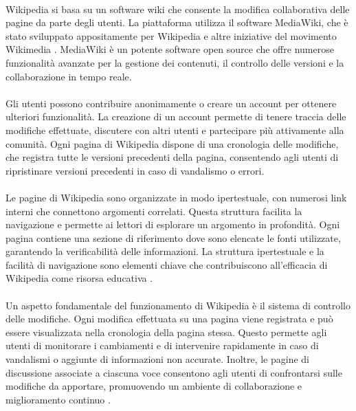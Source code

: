 \documentclass[12pt,a4paper]{report}
\begin{document}
\paragraph*{}
Wikipedia si basa su un software wiki che consente la modifica collaborativa delle pagine da parte degli utenti. La piattaforma utilizza il software MediaWiki, che è stato sviluppato appositamente per Wikipedia e altre iniziative del movimento Wikimedia \cite{denning2005wikipedia}. MediaWiki è un potente software open source che offre numerose funzionalità avanzate per la gestione dei contenuti, il controllo delle versioni e la collaborazione in tempo reale.
\paragraph*{}
Gli utenti possono contribuire anonimamente o creare un account per ottenere ulteriori funzionalità. La creazione di un account permette di tenere traccia delle modifiche effettuate, discutere con altri utenti e partecipare più attivamente alla comunità. Ogni pagina di Wikipedia dispone di una cronologia delle modifiche, che registra tutte le versioni precedenti della pagina, consentendo agli utenti di ripristinare versioni precedenti in caso di vandalismo o errori.
\paragraph*{}
Le pagine di Wikipedia sono organizzate in modo ipertestuale, con numerosi link interni che connettono argomenti correlati. Questa struttura facilita la navigazione e permette ai lettori di esplorare un argomento in profondità. Ogni pagina contiene una sezione di riferimento dove sono elencate le fonti utilizzate, garantendo la verificabilità delle informazioni. La struttura ipertestuale e la facilità di navigazione sono elementi chiave che contribuiscono all'efficacia di Wikipedia come risorsa educativa \cite{reagle2010good}.
\paragraph*{}
Un aspetto fondamentale del funzionamento di Wikipedia è il sistema di controllo delle modifiche. Ogni modifica effettuata su una pagina viene registrata e può essere visualizzata nella cronologia della pagina stessa. Questo permette agli utenti di monitorare i cambiamenti e di intervenire rapidamente in caso di vandalismi o aggiunte di informazioni non accurate. Inoltre, le pagine di discussione associate a ciascuna voce consentono agli utenti di confrontarsi sulle modifiche da apportare, promuovendo un ambiente di collaborazione e miglioramento continuo \cite{jemielniak2014wikipedia}.
\end{document}
